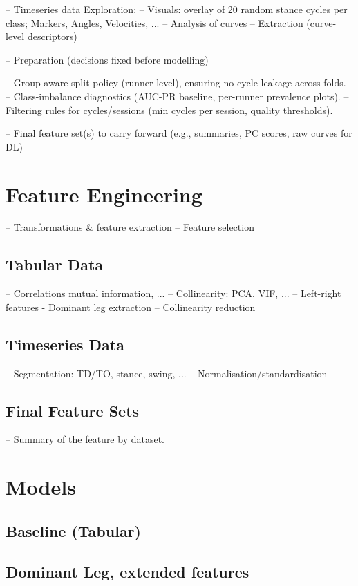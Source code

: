 -- Timeseries data Exploration:
-- Visuals: overlay of 20 random stance cycles per class; Markers, Angles, Velocities, ...
-- Analysis of curves
-- Extraction (curve-level descriptors)


-- Preparation (decisions fixed before modelling)

-- Group-aware split policy (runner-level), ensuring no cycle leakage across folds.
-- Class-imbalance diagnostics (AUC-PR baseline, per-runner prevalence plots).
-- Filtering rules for cycles/sessions (min cycles per session, quality thresholds).

-- Final feature set(s) to carry forward (e.g., summaries, PC scores, raw curves for DL)

\section{Feature Engineering}\label{sec:method-feature-engineering}
-- Transformations \& feature extraction
-- Feature selection

\subsection{Tabular Data}\label{subsec:method-tabular-data}
-- Correlations mutual information, ...
-- Collinearity: PCA, VIF, ...
-- Left-right features - Dominant leg extraction
-- Collinearity reduction

\subsection{Timeseries Data}\label{subsec:method-timeseries-data}
-- Segmentation: TD/TO, stance, swing, ...
-- Normalisation/standardisation

\subsection{Final Feature Sets}\label{subsec:method-final-feature-sets}
-- Summary of the feature by dataset.

\section{Models}\label{sec:method-models}
\subsection{Baseline (Tabular)}\label{subsec:baselines}
\subsection{Dominant Leg, extended features}\label{subsec:baselines-timeseries}  %
